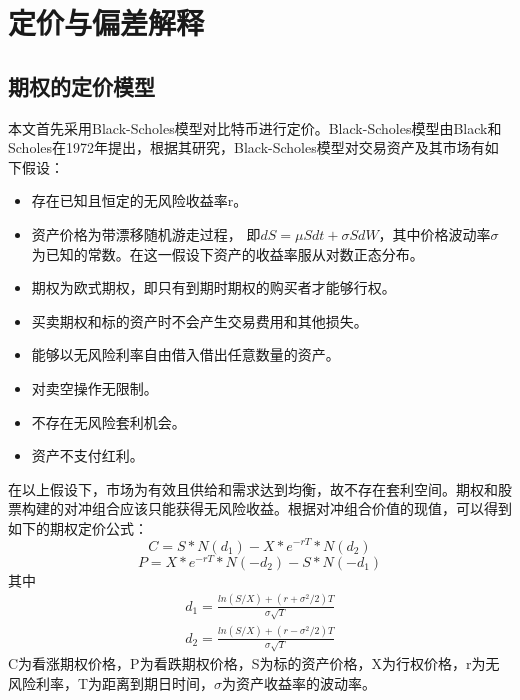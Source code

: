 \chapter{定价与偏差解释}\label{research_method}
    \section{期权的定价模型}\label{pricing_model}
    本文首先采用Black-Scholes模型对比特币进行定价。Black-Scholes模型由Black和Scholes在1972年提出\cite{J-1972}，根据其研究，Black-Scholes模型对交易资产及其市场有如下假设：
    \begin{itemize}
        \item 存在已知且恒定的无风险收益率r。
        \item 资产价格为带漂移随机游走过程， 即$dS={\mu}Sdt+{\sigma}SdW$，其中价格波动率$\sigma$为已知的常数。在这一假设下资产的收益率服从对数正态分布。
        \item 期权为欧式期权，即只有到期时期权的购买者才能够行权。
        \item 买卖期权和标的资产时不会产生交易费用和其他损失。
        \item 能够以无风险利率自由借入借出任意数量的资产。
        \item 对卖空操作无限制。
        \item 不存在无风险套利机会。
        \item 资产不支付红利。
    \end{itemize}
    在以上假设下，市场为有效且供给和需求达到均衡，故不存在套利空间。期权和股票构建的对冲组合应该只能获得无风险收益。根据对冲组合价值的现值，可以得到如下的期权定价公式：
    \begin{equation}\label{bs-call}
            C=S*N(d_1)-X*e^{-rT}*N(d_2) 
    \end{equation}
    \begin{equation}\label{bs-put}
        P=X*e^{-rT}*N(-d_2)-S*N(-d_1)
    \end{equation}
    其中
    \begin{equation*}
        \begin{split}
        d_1=\frac{ln(S/X)+(r+\sigma^2/2)T}{\sigma{\sqrt{T}}} \\
        d_2=\frac{ln(S/X)+(r-\sigma^2/2)T}{\sigma{\sqrt{T}}}
        \end{split}
    \end{equation*}
    C为看涨期权价格，P为看跌期权价格，S为标的资产价格，X为行权价格，r为无风险利率，T为距离到期日时间，$\sigma$为资产收益率的波动率。
    
